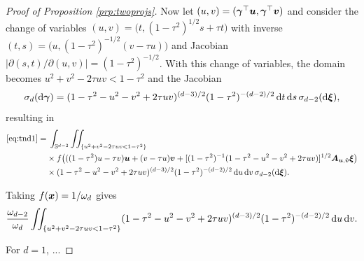\documentclass[oneside,11pt]{article}
\begin{document}
\begin{proof}[Proof of Proposition \ref{prp:twoprojs}]
Now let $(u,v)=(\boldsymbol\gamma^\top \boldsymbol{u},\boldsymbol\gamma^\top \boldsymbol{v})$ and consider the change of variables $(u,v)=\big(t,(1-\tau^2)^{1/2}s+\tau t\big)$ with inverse $(t,s)=\big(u,(1-\tau^2)^{-1/2}(v-\tau u)\big)$ and Jacobian $|\partial (s,t)/\partial (u,v)|=(1-\tau^2)^{-1/2}$. With this change of variables, the domain becomes $
u^2+v^2-2\tau uv<1-\tau^2$ and the Jacobian
\begin{align*}
    \sigma_d(\mathrm{d}\boldsymbol\gamma)=(1-\tau^2-u^2-v^2+2\tau uv)^{(d-3)/2}(1-\tau^2)^{-(d-2)/2}\,\mathrm{d} t\,\mathrm{d} s\,\sigma_{d-2}(\mathrm{d}\boldsymbol\xi),
\end{align*}
resulting in
\begin{align*}
\eqref{eq:tnd1}=&\;\int_{\mathbb{S}^{d-2}}\iint_{\{u^2+v^2-2\tau uv<1-\tau^2\}}\\
    &\times f\big(((1-\tau^2)u-\tau v)\boldsymbol{u}+(v-\tau u)\boldsymbol{v}+[(1-\tau^2)^{-1}(1-\tau^2-u^2-v^2+2\tau uv)]^{1/2}\boldsymbol{A}_{\boldsymbol{u},\tilde{\boldsymbol{v}}}\boldsymbol\xi\big)\\
    &\times (1-\tau^2-u^2-v^2+2\tau uv)^{(d-3)/2}(1-\tau^2)^{-(d-2)/2}\,\mathrm{d} u\,\mathrm{d} v\,\sigma_{d-2}(\mathrm{d}\boldsymbol\xi).
\end{align*}

Taking $f(\boldsymbol{x})=1/\omega_{d}$ gives
\begin{align*}
    \frac{\omega_{d-2}}{\omega_{d}} \iint_{\{u^2+v^2-2\tau uv<1-\tau^2\}} (1-\tau^2-u^2-v^2+2\tau uv)^{(d-3)/2}(1-\tau^2)^{-(d-2)/2}\,\mathrm{d} u\,\mathrm{d} v.
\end{align*}

{\color{purple}For $d=1$, ...}
\end{proof}
\end{document}
